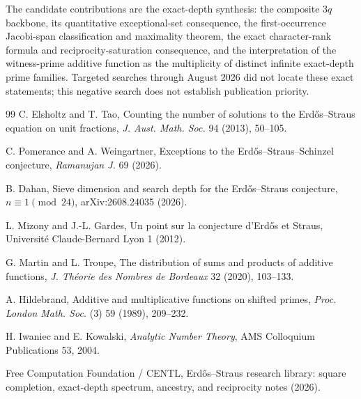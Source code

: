 \documentclass[11pt]{article}
\theoremstyle{definition}
\begin{document}
The candidate contributions are the exact-depth synthesis: the composite $3q$ backbone, its quantitative exceptional-set consequence, the first-occurrence Jacobi-span classification and maximality theorem, the exact character-rank formula and reciprocity-saturation consequence, and the interpretation of the witness-prime additive function as the multiplicity of distinct infinite exact-depth prime families. Targeted searches through August 2026 did not locate these exact statements; this negative search does not establish publication priority.

\begin{thebibliography}{99}
C. Elsholtz and T. Tao,
Counting the number of solutions to the Erd\H{o}s--Straus equation on unit fractions,
\emph{J. Aust. Math. Soc.} 94 (2013), 50--105.

C. Pomerance and A. Weingartner,
Exceptions to the Erd\H{o}s--Straus--Schinzel conjecture,
\emph{Ramanujan J.} 69 (2026).

B. Dahan,
Sieve dimension and search depth for the Erd\H{o}s--Straus conjecture, $n\equiv1\pmod{24}$,
arXiv:2608.24035 (2026).

L. Mizony and J.-L. Gardes,
Un point sur la conjecture d'Erd\H{o}s et Straus,
Universit\'e Claude-Bernard Lyon 1 (2012).

G. Martin and L. Troupe,
The distribution of sums and products of additive functions,
\emph{J. Th\'eorie des Nombres de Bordeaux} 32 (2020), 103--133.

A. Hildebrand,
Additive and multiplicative functions on shifted primes,
\emph{Proc. London Math. Soc.} (3) 59 (1989), 209--232.

H. Iwaniec and E. Kowalski,
\emph{Analytic Number Theory},
AMS Colloquium Publications 53, 2004.

Free Computation Foundation / CENTL,
Erd\H{o}s--Straus research library: square completion, exact-depth spectrum, ancestry, and reciprocity notes (2026).
\end{thebibliography}
\end{document}
